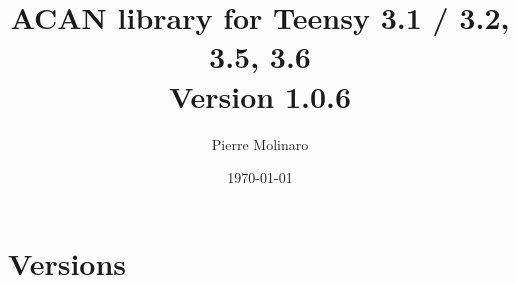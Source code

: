 \documentclass[10pt, a4paper, obeyspaces, openany]{extarticle}
\begin{document}
 


\title{\bf \Huge{ACAN library for Teensy 3.1 / 3.2, 3.5, 3.6\\Version 1.0.6}}
\author{Pierre Molinaro}
\date {\today}

\maketitle


\tableofcontents


\section{Versions}
\end{document}
